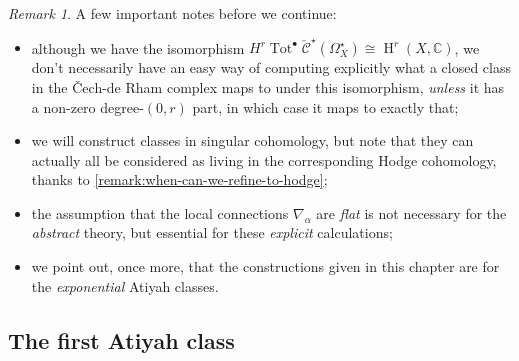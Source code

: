 \documentclass[11pt,fleqn]{article}
\theoremstyle{plain}
\theoremstyle{definition}
\theoremstyle{remark}
\newtheorem{remark}[theorem]{Remark}
\numberwithin{equation}{theorem}
\newcommand{\anotherbullet}{\star}
\newcommand{\cech}{\check{\mathscr{C}}}
\DeclareMathOperator{\Tot}{Tot}
\DeclareMathOperator{\HH}{H}
\begin{document}
        \begin{remark}
            A few important notes before we continue:
            \begin{itemize}
                \item although we have the isomorphism $H^r\Tot^\bullet\cech^\anotherbullet(\Omega^\anotherbullet_X) \cong \HH^r(X,\mathbb{C})$, we don't necessarily have an easy way of computing explicitly what a closed class in the Čech-de Rham complex maps to under this isomorphism, \emph{unless} it has a non-zero degree-$(0,r)$ part, in which case it maps to exactly that;
                \item we will construct classes in singular cohomology, but note that they can actually all be considered as living in the corresponding Hodge cohomology, thanks to \cref{remark:when-can-we-refine-to-hodge};
                \item the assumption that the local connections $\nabla_\alpha$ are \emph{flat} is not necessary for the \emph{abstract} theory, but essential for these \emph{explicit} calculations;
                \item we point out, once more, that the constructions given in this chapter are for the \emph{exponential} Atiyah classes.
            \end{itemize}
        \end{remark}


    \subsection{The first Atiyah class}\label{subsection:first-manual-atiyah-class}
\end{document}
